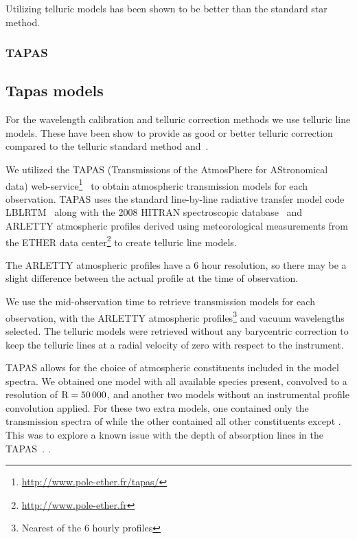 Utilizing telluric models has been shown to be better than the standard star method.
\subsubsection{TAPAS}

\subsection{Tapas models}
\label{subsec:tapas_models}
For the wavelength calibration and telluric correction methods we use telluric line models. These have been show to provide as good or better telluric correction compared to the telluric standard method and~\citep{ulmer-moll_telluric_2018}.

We utilized the {TAPAS} (Transmissions of the AtmosPhere for AStronomical data) web-service\footnote{\url{http://www.pole-ether.fr/tapas/}}~\citep{bertaux_tapas_2014} to obtain atmospheric transmission models for each observation. {TAPAS} uses the standard line-by-line radiative transfer model code LBLRTM~\citep{clough_linebyline_1995} along with the 2008 {HITRAN} spectroscopic database~\citep{rothman_hitran_2009} and {ARLETTY} atmospheric profiles derived using meteorological measurements from the {ETHER} data center\footnote{\url{http://www.pole-ether.fr}} to create telluric line models.

The {ARLETTY} atmospheric profiles have a 6 hour resolution, so there may be a slight difference between the actual profile at the time of observation.

We use the mid-observation time to retrieve transmission models for each observation, with the {ARLETTY} atmospheric profiles\footnote{Nearest of the 6 hourly profiles} and vacuum wavelengths selected. The telluric models were retrieved without any barycentric correction to keep the telluric lines at a radial velocity of zero with respect to the instrument.

{TAPAS} allows for the choice of atmospheric constituents included in the model spectra. We obtained one model with all available species present, convolved to a resolution of \(\rm R=50\,000\), and another two models without an instrumental profile convolution applied. For these two extra models, one contained only the transmission spectra of while the other contained all other constituents except . This was to explore a known issue with the depth of absorption lines in the TAPAS~\citet{bertaux_tapas_2014}. .


